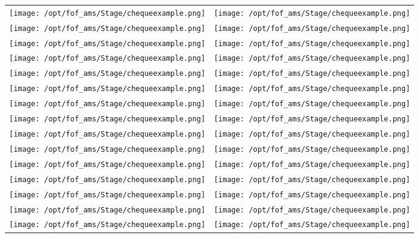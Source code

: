 \documentclass{article}%
\begin{document}
\newpage%
\begin{longtabu}{X[c] X[c]}%
\texttt{[image: /opt/fof\_ams/Stage/chequeexample.png]}&\texttt{[image: /opt/fof\_ams/Stage/chequeexample.png]}\\%
\texttt{[image: /opt/fof\_ams/Stage/chequeexample.png]}&\texttt{[image: /opt/fof\_ams/Stage/chequeexample.png]}\\%
\texttt{[image: /opt/fof\_ams/Stage/chequeexample.png]}&\texttt{[image: /opt/fof\_ams/Stage/chequeexample.png]}\\%
\texttt{[image: /opt/fof\_ams/Stage/chequeexample.png]}&\texttt{[image: /opt/fof\_ams/Stage/chequeexample.png]}\\%
\texttt{[image: /opt/fof\_ams/Stage/chequeexample.png]}&\texttt{[image: /opt/fof\_ams/Stage/chequeexample.png]}\\%
\texttt{[image: /opt/fof\_ams/Stage/chequeexample.png]}&\texttt{[image: /opt/fof\_ams/Stage/chequeexample.png]}\\%
\texttt{[image: /opt/fof\_ams/Stage/chequeexample.png]}&\texttt{[image: /opt/fof\_ams/Stage/chequeexample.png]}\\%
\texttt{[image: /opt/fof\_ams/Stage/chequeexample.png]}&\texttt{[image: /opt/fof\_ams/Stage/chequeexample.png]}\\%
\texttt{[image: /opt/fof\_ams/Stage/chequeexample.png]}&\texttt{[image: /opt/fof\_ams/Stage/chequeexample.png]}\\%
\texttt{[image: /opt/fof\_ams/Stage/chequeexample.png]}&\texttt{[image: /opt/fof\_ams/Stage/chequeexample.png]}\\%
\texttt{[image: /opt/fof\_ams/Stage/chequeexample.png]}&\texttt{[image: /opt/fof\_ams/Stage/chequeexample.png]}\\%
\texttt{[image: /opt/fof\_ams/Stage/chequeexample.png]}&\texttt{[image: /opt/fof\_ams/Stage/chequeexample.png]}\\%
\texttt{[image: /opt/fof\_ams/Stage/chequeexample.png]}&\texttt{[image: /opt/fof\_ams/Stage/chequeexample.png]}\\%
\texttt{[image: /opt/fof\_ams/Stage/chequeexample.png]}&\texttt{[image: /opt/fof\_ams/Stage/chequeexample.png]}\\%
\texttt{[image: /opt/fof\_ams/Stage/chequeexample.png]}&\texttt{[image: /opt/fof\_ams/Stage/chequeexample.png]}\\%

\end{longtabu}
\end{document}
